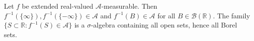 Let $f$ be extended real-valued $\mathcal{A}$-measurable. Then $f^{-1}(\{\infty\}), f^{-1}(\{-\infty\}) \in \mathcal{A}$ and $f^{-1}(B) \in \mathcal{A}$ for all $B \in \mathcal{B}(\mathbb{R})$. The family $\{S \subset \mathbb{R} : f^{-1}(S) \in \mathcal{A}\}$ is a $\sigma$-algebra containing all open sets, hence all Borel sets.
